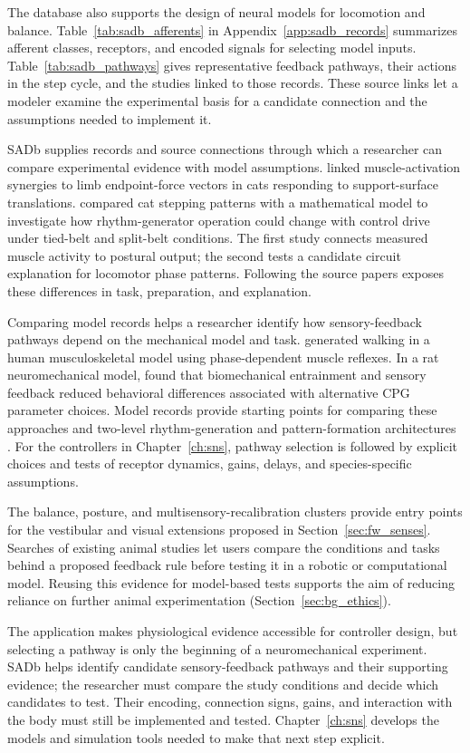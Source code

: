 The database also supports the design of neural models for locomotion and balance. Table~\ref{tab:sadb_afferents} in Appendix~\ref{app:sadb_records} summarizes afferent classes, receptors, and encoded signals for selecting model inputs. Table~\ref{tab:sadb_pathways} gives representative feedback pathways, their actions in the step cycle, and the studies linked to those records. These source links let a modeler examine the experimental basis for a candidate connection and the assumptions needed to implement it.

SADb supplies records and source connections through which a researcher can compare experimental evidence with model assumptions. \citet{ting_limited_2005} linked muscle-activation synergies to limb endpoint-force vectors in cats responding to support-surface translations. \citet{latash_organization_2020} compared cat stepping patterns with a mathematical model to investigate how rhythm-generator operation could change with control drive under tied-belt and split-belt conditions. The first study connects measured muscle activity to postural output; the second tests a candidate circuit explanation for locomotor phase patterns. Following the source papers exposes these differences in task, preparation, and explanation.

Comparing model records helps a researcher identify how sensory-feedback pathways depend on the mechanical model and task. \citet{geyer_musclereflex_2010} generated walking in a human musculoskeletal model using phase-dependent muscle reflexes. In a rat neuromechanical model, \citet{deng_biomechanical_2022} found that biomechanical entrainment and sensory feedback reduced behavioral differences associated with alternative CPG parameter choices. Model records provide starting points for comparing these approaches and two-level rhythm-generation and pattern-formation architectures \citep{rybak_modelling_2006}. For the controllers in Chapter~\ref{ch:sns}, pathway selection is followed by explicit choices and tests of receptor dynamics, gains, delays, and species-specific assumptions.

The balance, posture, and multisensory-recalibration clusters provide entry points for the vestibular and visual extensions proposed in Section~\ref{sec:fw_senses}. Searches of existing animal studies let users compare the conditions and tasks behind a proposed feedback rule before testing it in a robotic or computational model. Reusing this evidence for model-based tests supports the aim of reducing reliance on further animal experimentation (Section~\ref{sec:bg_ethics}).

The application makes physiological evidence accessible for controller design, but selecting a pathway is only the beginning of a neuromechanical experiment. SADb helps identify candidate sensory-feedback pathways and their supporting evidence; the researcher must compare the study conditions and decide which candidates to test. Their encoding, connection signs, gains, and interaction with the body must still be implemented and tested. Chapter~\ref{ch:sns} develops the models and simulation tools needed to make that next step explicit.
